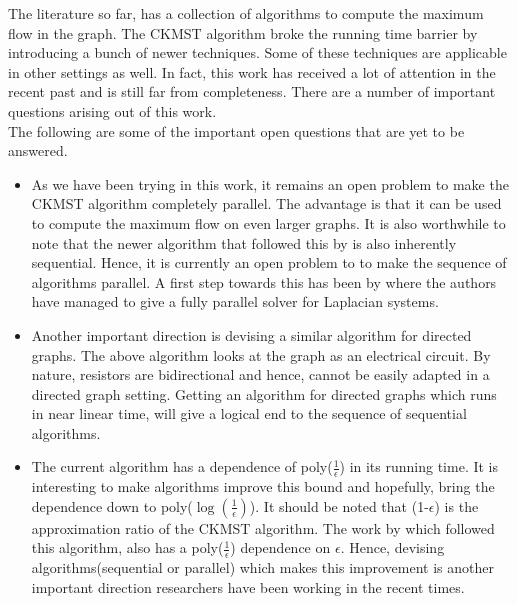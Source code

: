 \documentclass[BTech]{iitmdiss}
\begin{document}
		
		    The literature so far, has a collection of algorithms to compute the maximum flow in the graph. The CKMST algorithm broke 
		the running time barrier by introducing a bunch of newer techniques. Some of these techniques are applicable in other settings as well.
		In fact, this work has received a lot of attention in the recent past and is still far from completeness.
		There are a number of important questions arising out of this work. \\
		 
		 The following are some of the important open questions that are yet to be answered.
		 \begin{itemize}
		  \item 
		    As we have been trying in this work, it remains an open problem to make the CKMST algorithm completely parallel.
		    The advantage is that it can be used to compute the maximum flow on even larger graphs. It is also worthwhile to note that 
		 the newer algorithm that followed this by \cite{DBLP:journals/corr/abs-1304-2338} is also inherently sequential. Hence, it is currently an open problem to
		 to make the sequence of algorithms parallel. A first step towards this has been by \cite{DBLP:journals/corr/PengS13} where the authors have managed
		 to give a fully parallel solver for Laplacian systems. \\
		 
		 \item
		    Another important direction is devising a similar algorithm for directed graphs. The above algorithm looks at the graph as an electrical
		 circuit. By nature, resistors are bidirectional and hence, cannot be easily adapted in a directed graph setting. Getting an algorithm 
		 for directed graphs which runs in near linear time, will give a logical end to the sequence of sequential algorithms. \\
		 
		 \item
		    The current algorithm has a dependence of poly($\frac{1}{\epsilon}$) in its running time. It is interesting to make algorithms 
		 improve this bound and hopefully, bring the dependence down to poly($\log (\frac{1}{\epsilon})$). It should be noted that (1-$\epsilon$) is the approximation
		 ratio of the CKMST algorithm. The work by \cite{DBLP:journals/corr/abs-1304-2338} which followed this algorithm, also has a poly($\frac{1}{\epsilon}$)
		 dependence on $\epsilon$. Hence, devising algorithms(sequential or parallel) which makes this improvement is another important
		 direction researchers have been working in the recent times.
		 \end{itemize}
		 
		 
		
\pagebreak
\begin{singlespace}
  \begin{small}
	
  \end{small}
\end{singlespace}

\end{document}
